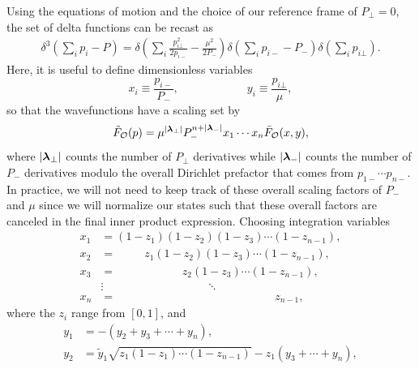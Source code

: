 \begin{subappendices}
Using the equations of motion and the choice of our reference frame of $P_\bot = 0$, the set of delta functions can be recast as \begin{equation}
	\begin{aligned}
		\delta^3\left(\sum_i p_i - P \right) = \delta\left(\sum_i \frac{p_{i\bot}^2}{2p_{i-}} - \frac{\mu^2}{2P_-} \right)\delta\left(\sum_i p_{i-} - P_- \right)\delta\left(\sum_i p_{i\bot}\right).
	\end{aligned}
\end{equation} Here, it is useful to define dimensionless variables \begin{equation}
	x_i \equiv \frac{p_{i-}}{P_-},\quad\quad\quad\quad\quad\quad y_i \equiv \frac{p_{i\bot}}{\mu}, \label{dimlessvars}
\end{equation} so that the wavefunctions have a scaling set by \begin{equation}
	\tilde{F}_{{\cal O}}(p) = \mu^{|\boldsymbol{\lambda}_\bot|} P_-^{n+|\boldsymbol{\lambda}_-|} x_1 \dotsb x_n \bar{F}_{{\cal O}}(x,y),
\end{equation} where $|\boldsymbol{\lambda}_\bot|$ counts the number of $P_\bot$ derivatives while $|\boldsymbol{\lambda}_-|$ counts the number of $P_-$ derivatives modulo the overall Dirichlet prefactor that comes from $p_{1-} \dotsb p_{n-}$. In practice, we will not need to keep track of these overall scaling factors of $P_-$ and $\mu$ since we will normalize our states such that these overall factors are canceled in the final inner product expression. Choosing integration variables \begin{equation}
		\begin{aligned}
			x_1 &= (1-z_1)(1-z_2)(1-z_3) \dotsb (1-z_{n-1}), \\
			x_2 &= \quad\quad\,\,\, z_1(1-z_2)(1-z_3) \dotsb (1-z_{n-1}), \\
			x_3 &= \quad\quad\,\,\, \quad\quad\quad\,\, z_2(1-z_3) \dotsb (1-z_{n-1}), \\
			&\vdots \quad\quad\quad\quad\quad\quad\quad\quad\quad \ddots \\
			x_n &= \quad\quad\quad\quad\quad\quad\quad\quad\quad\quad\quad\quad\quad\quad z_{n-1}, \label{xtrans}
		\end{aligned}
	\end{equation} where the $z_i$ range from $[0, 1]$, and \begin{equation}
		\begin{aligned}
			y_1 &= -(y_2+ y_3 + \dotsb + y_n), \\
			y_2 &= \tilde{y}_1 \sqrt{z_1(1-z_1) \dotsb (1-z_{n-1})} - z_1(y_3 + \dotsb + y_n), \\

\end{aligned}
\end{equation}
\end{subappendices}
